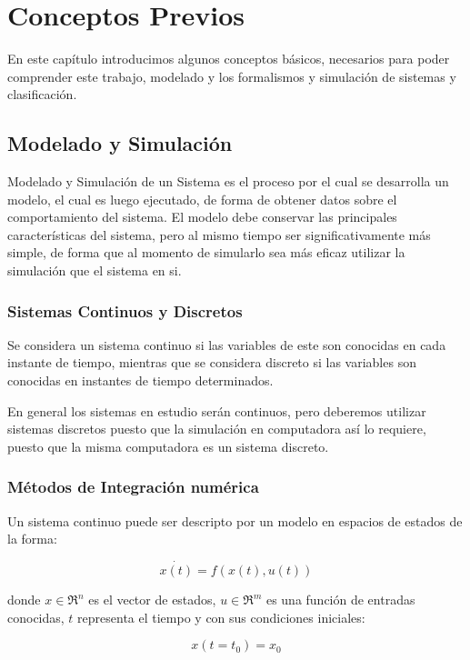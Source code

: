 \documentclass[a4paper,	11pt]{report}
\begin{document}
	
\chapter{Conceptos Previos}
En este capítulo introducimos algunos conceptos básicos, necesarios para poder comprender este trabajo, modelado y los formalismos y simulación de sistemas y clasificación.

\section{Modelado y Simulación}
Modelado y Simulación de un Sistema es el proceso por el cual se desarrolla un modelo, el cual es luego ejecutado, de forma de obtener datos sobre el comportamiento del sistema. El modelo debe conservar las principales características del sistema, pero al mismo tiempo ser significativamente más simple, de forma que al momento de simularlo sea más eficaz utilizar la simulación que el sistema en si.

\subsection{Sistemas Continuos y Discretos}
Se considera un sistema continuo si las variables de este son conocidas en cada instante de tiempo, mientras que se considera discreto si las variables son conocidas en instantes de tiempo determinados.

En general los sistemas en estudio serán continuos, pero deberemos utilizar sistemas discretos puesto que la simulación en computadora así lo requiere, puesto que la misma computadora es un sistema discreto.

\subsection{Métodos de Integración numérica}
Un sistema continuo puede ser descripto por un modelo en espacios de estados de la forma:

\begin{equation} \label{eq1}
\dot{x(t)} = f (x(t), u(t))
\end{equation}

donde $x \in \Re^n$  es el vector de estados, $u \in \Re^m$ es una función de entradas conocidas,
$t$ representa el tiempo y con sus condiciones iniciales:

\begin{equation} \label{eq2}
x(t = t_0 ) = x_0
\end{equation}
\end{document}
